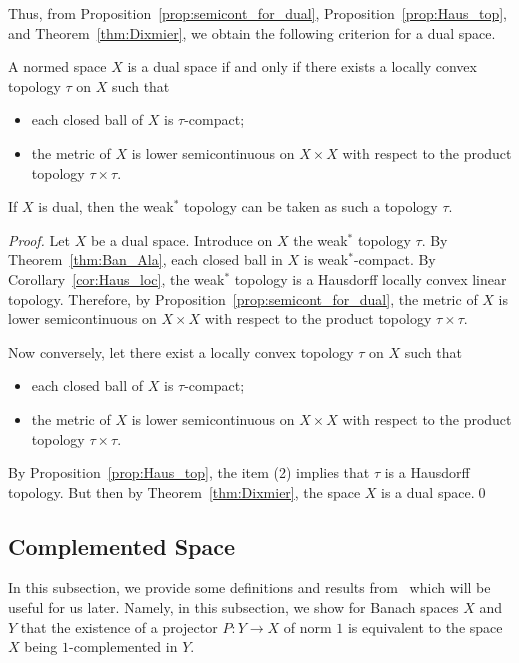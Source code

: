 \documentclass{svproc}
\begin{document}
Thus, from Proposition~\ref{prop:semicont_for_dual}, Proposition~\ref{prop:Haus_top}, and Theorem~\ref{thm:Dixmier}, we obtain the following criterion for a dual space.

\begin{theorem}\label{thm:dual}
A normed space $X$ is a dual space if and only if there exists a locally convex topology $\tau$ on $X$ such that
\begin{itemize}
\item each closed ball of $X$ is $\tau$-compact;
\item the metric of $X$ is lower semicontinuous on $X\times X$ with respect to the product topology $\tau\times \tau$.
\end{itemize}
If $X$ is dual, then the weak$^*$ topology can be taken as such a topology $\tau$.
\end{theorem}

\begin{proof}

Let $X$ be a dual space. Introduce on $X$ the weak$^*$ topology $\tau$. By Theorem~\ref{thm:Ban_Ala}, each closed ball in $X$ is weak$^*$-compact. By Corollary~\ref{cor:Haus_loc}, the weak$^*$ topology is a Hausdorff locally convex linear topology. Therefore, by Proposition~\ref{prop:semicont_for_dual}, the metric of $X$ is lower semicontinuous on $X\times X$ with respect to the product topology $\tau\times \tau$.

Now conversely, let there exist a locally convex topology $\tau$ on $X$ such that
\begin{itemize}
\item[(1)] each closed ball of $X$ is $\tau$-compact;
\item[(2)] the metric of $X$ is lower semicontinuous on $X\times X$ with respect to the product topology $\tau\times \tau$.
\end{itemize}
By Proposition~\ref{prop:Haus_top}, the item (2) implies that $\tau$ is a Hausdorff topology. But then by Theorem~\ref{thm:Dixmier}, the space $X$ is a dual space.\qed

\end{proof}


\subsection{Complemented Space}\label{sec:complemented}

In this subsection, we provide some definitions and results from~\cite{Rudin} which will be useful for us later. Namely, in this subsection, we show for Banach spaces $X$ and $Y$ that the existence of a projector $P\colon Y\rightarrow X$ of norm $1$ is equivalent to the space $X$ being $1$-complemented in $Y$.
\end{document}
